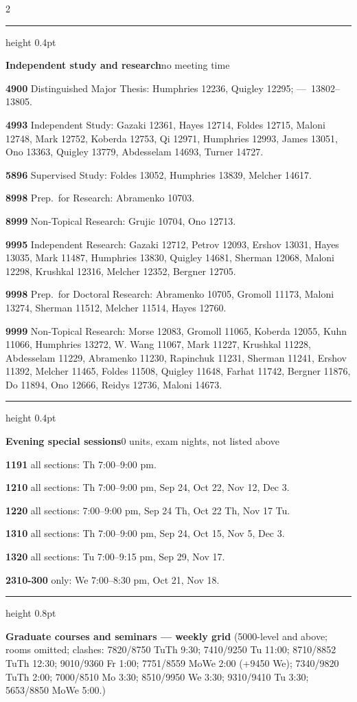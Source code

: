 \documentclass[8pt,landscape]{extarticle}
\newcommand{\GridRoomNote}{rooms omitted;\space}
\newcommand{\GridRoomNote}{room in parentheses;\space}
\newcommand{\Ch}[3]{%
  \par\addvspace{2.4pt}\penalty-200
  {\color{hdr}\hrule height 0.4pt}\nobreak\vspace{0.9pt}\nobreak
  \textbf{#1}\hspace{0.6em}#2\hfill\textcolor{lite}{#3}\par\nobreak\vspace{0.9pt}\nobreak}
\newcommand{\tbd}{\textcolor{lite}{---}}
\begin{document}
\begin{multicols}{2}
\Ch{Independent study and research}{no meeting time}{}
\textbf{4900} Distinguished Major Thesis: Humphries 12236, Quigley 12295;
\tbd\ 13802--13805.\par
\textbf{4993} Independent Study: Gazaki 12361, Hayes 12714, Foldes 12715,
Maloni 12748, Mark 12752, Koberda 12753, Qi 12971, Humphries 12993,
James 13051, Ono 13363, Quigley 13779, Abdesselam 14693, Turner 14727.\par
\textbf{5896} Supervised Study: Foldes 13052, Humphries 13839, Melcher 14617.\par
\textbf{8998} Prep.\ for Research: Abramenko 10703.\par
\textbf{8999} Non-Topical Research: Grujic 10704, Ono 12713.\par
\textbf{9995} Independent Research: Gazaki 12712, Petrov 12093,
Ershov 13031, Hayes 13035, Mark 11487, Humphries 13830, Quigley 14681,
Sherman 12068, Maloni 12298, Krushkal 12316, Melcher 12352, Bergner 12705.\par
\textbf{9998} Prep.\ for Doctoral Research: Abramenko 10705, Gromoll 11173,
Maloni 13274, Sherman 11512, Melcher 11514, Hayes 12760.\par
\textbf{9999} Non-Topical Research: Morse 12083, Gromoll 11065, Koberda 12055,
Kuhn 11066, Humphries 13272, W. Wang 11067, Mark 11227, Krushkal 11228,
Abdesselam 11229, Abramenko 11230, Rapinchuk 11231, Sherman 11241,
Ershov 11392, Melcher 11465, Foldes 11508, Quigley 11648, Farhat 11742,
Bergner 11876, Do 11894, Ono 12666, Reidys 12736, Maloni 14673.\par

\Ch{Evening special sessions}{0 units, exam nights, not listed above}{}
\textbf{1191} all sections: Th 7:00--9:00 pm.\par
\textbf{1210} all sections: Th 7:00--9:00 pm, Sep 24, Oct 22, Nov 12, Dec 3.\par
\textbf{1220} all sections: 7:00--9:00 pm, Sep 24 Th, Oct 22 Th, Nov 17 Tu.\par
\textbf{1310} all sections: Th 7:00--9:00 pm, Sep 24, Oct 15, Nov 5, Dec 3.\par
\textbf{1320} all sections: Tu 7:00--9:15 pm, Sep 29, Nov 17.\par
\textbf{2310-300} only: We 7:00--8:30 pm, Oct 21, Nov 18.\par

\end{multicols}

\vspace{2pt}
{\color{hdr}\hrule height 0.8pt}
\vspace{3pt}
\textbf{Graduate courses and seminars --- weekly grid}\hspace{1em}
\textcolor{lite}{(5000-level and above; \GridRoomNote
clashes: 7820/8750 TuTh 9:30; 7410/9250 Tu 11:00;
8710/8852 TuTh 12:30; 9010/9360 Fr 1:00;
7751/8559 MoWe 2:00 (+9450 We); 7340/9820 TuTh 2:00;
7000/8510 Mo 3:30; 8510/9950 We 3:30; 9310/9410 Tu 3:30;
5653/8850 MoWe 5:00.)}
\vspace{3pt}
\end{document}
